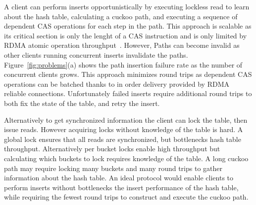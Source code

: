 A client can perform inserts opportunistically by executing
lockless read to learn about the hash table, calculating a
cuckoo path, and executing a sequence of dependent CAS
operations for each step in the path. This approach is
scalable as its critical section is only the lenght of a CAS
instruction and is only limited by RDMA atomic operation
throughput~\cite{design-guidelines}. However, Paths can
become invalid as other clients running concurrent inserts
invalidate the paths. Figure~\ref{fig:problems}(a) shows the
path insertion failure rate as the number of concurrent
clients grows. This approach minimizes round trips as
dependent CAS operations can be batched thanks to in order
delivery provided by RDMA reliable connections.
Unfortunately failed inserts require additional round trips
to both fix the state of the table, and retry the
insert.

Alternatively to get synchronized information the client can
lock the table, then issue reads. However acquiring locks
without knowledge of the table is hard. A global lock
ensures that all reads are synchronized, but bottlenecks
hash table throughput.  Alternatively per bucket locks
enable high throughput but calculating which buckets to lock
requires knowledge of the table. A long cuckoo path may
require locking many buckets and many round trips to gather
information about the hash table.
An ideal protocol would enable clients to perform inserts
without bottlenecks the insert performance of the hash
table, while requiring the fewest round trips to construct
and execute the cuckoo path.


